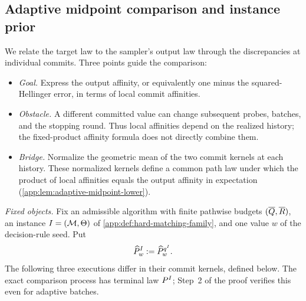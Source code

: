 \begin{samepage}
\subsection{Adaptive midpoint comparison and instance prior}
\label{app:lower-proof-midpoint}

We relate the target law to the sampler's output law through the discrepancies
at individual commits. Three points guide the comparison:
\begin{itemize}
\item \emph{Goal.} Express the output affinity, or equivalently one minus the
squared-Hellinger error, in terms of local commit affinities.
\item \emph{Obstacle.} A different committed value can change subsequent
probes, batches, and the stopping round. Thus local affinities depend on the
realized history; the fixed-product affinity formula does not directly
combine them.
\item \emph{Bridge.} Normalize the geometric mean of the two commit kernels
at each history. These normalized kernels define a common path law under
which the product of local affinities equals the output affinity in
expectation (\cref{app:lem:adaptive-midpoint-lower}).
\end{itemize}
\end{samepage}

\emph{Fixed objects.}
Fix an admissible algorithm with finite pathwise budgets
\((\QueryBudget{},\RoundBudget{})\), an instance
\(I=(\HiddenMatching,\TriggerVector)\) of
\cref{app:def:hard-matching-family}, and one value \(w\) of the
decision-rule seed. Put
\begin{equation}
 \HardOutputLaw{I}{w}
 :=\SamplerOutputLaw{w}{\HardOracle{I}}.
 \label{app:eq:hard-seeded-output-law}
\end{equation}
The following three executions differ in their commit kernels, defined
below. The exact comparison process has terminal law \(\HardTargetLaw{I}\);
Step~2 of the proof verifies this even for adaptive batches.

